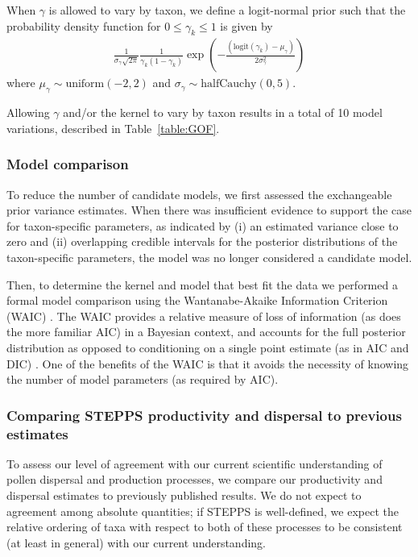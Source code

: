 \documentclass[12pt]{article}
\begin{document}
When $\gamma$ is allowed to vary by taxon, we define a logit-normal
prior such that the probability density function for $0 \leq \gamma_k
\leq 1$ is given by
\begin{align}
\frac{1}{\sigma_\gamma \sqrt{2 \pi}}\frac{1}{ \gamma_k ( 1 - \gamma_k )}\exp \left(- \frac{(\text{logit}(\gamma_k) - \mu_{\gamma})}{2 \sigma_{\gamma}^2} \right)
\end{align} 
where $\mu_{\gamma} \sim \text{uniform}(-2, 2)$ and $\sigma_{\gamma}
\sim \text{halfCauchy}(0,5)$.

Allowing $\gamma$ and/or the kernel to vary by taxon results in a
total of 10 model variations, described in Table~\ref{table:GOF}.

\subsubsection{Model comparison}

To reduce the number of candidate models, we first assessed the
exchangeable prior variance estimates. When there was insufficient
evidence to support the case for taxon-specific parameters, as
indicated by (i) an estimated variance close to zero and (ii)
overlapping credible intervals for the posterior distributions of the
taxon-specific parameters, the model was no longer considered a
candidate model.

Then, to determine the kernel and model that best fit the data we
performed a formal model comparison using the Wantanabe-Akaike
Information Criterion (WAIC) \citep{watanabe2010asymptotic}. The WAIC
provides a relative measure of loss of information (as does the more
familiar AIC) in a Bayesian context, and accounts for the full
posterior distribution as opposed to conditioning on a single point
estimate (as in AIC and DIC) \citep{gelman2014understanding}. One of
the benefits of the WAIC is that it avoids the necessity of knowing
the number of model parameters (as required by AIC).

\subsubsection{Comparing STEPPS productivity and dispersal to
  previous estimates}

To assess our level of agreement with our current scientific
understanding of pollen dispersal and production processes, we compare
our productivity and dispersal estimates to previously published
results. We do not expect to agreement among absolute quantities; if
STEPPS is well-defined, we expect the relative ordering of taxa with
respect to both of these processes to be consistent (at least in
general) with our current understanding.
\end{document}
